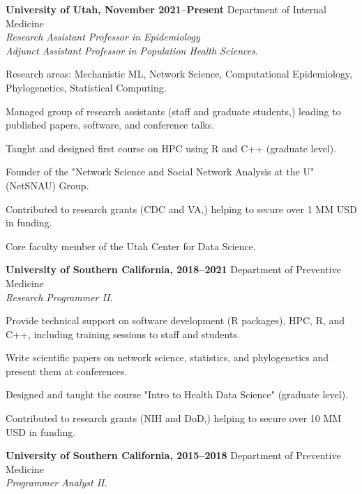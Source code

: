 \documentclass[letterpaper, 9pt]{article}
\newcommand{\myorange}{myteal!70!black}
\renewcommand{\textbf}[1]{{\bfseries\color{\myorange}#1}}
\renewenvironment{itemize}{
  \begin{list}{}{
    \setlength{\leftmargin}{0.3cm}
  }
}{
  \end{list}
}
\begin{document}
\begin{itemize}
\item \textbf{University of Utah, November 2021--Present} Department of Internal Medicine\\
\emph{Research Assistant Professor in Epidemiology}\\
\emph{Adjunct Assistant Professor in Population Health Sciences}. 
\begin{itemize}
	\item[-] Research areas: Mechanistic ML, Network Science, Computational Epidemiology, Phylogenetics, Statistical Computing.
	\item[-] Managed group of research assistants (staff and graduate students,) leading to published papers, software, and conference talks.
	\item[-] Taught and designed first course on HPC using R and C++ (graduate level).
	\item[-] Founder of the "Network Science and Social Network Analysis at the U" (NetSNAU) Group.
	\item[-] Contributed to research grants (CDC and VA,) helping to secure over 1 MM USD in funding.
	\item[-] Core faculty member of the Utah Center for Data Science.
\end{itemize}
\item \textbf{University of Southern California, 2018--2021} Department of Preventive Medicine\\\emph{Research Programmer II}.
\begin{itemize}
	\item[-] Provide technical support on software development (R packages), HPC, R, and C++, including training sessions to staff and students.
	\item[-] Write scientific papers on network science, statistics, and phylogenetics and present them at conferences.
	\item[-] Designed and taught the course "Intro to Health Data Science" (graduate level).
	\item[-] Contributed to research grants (NIH and DoD,) helping to secure over 10 MM USD in funding.
\end{itemize}
\item \textbf{University of Southern California, 2015--2018} Department of Preventive Medicine\\\emph{Programmer Analyst II}. 
\begin{itemize}

\end{itemize}
\end{itemize}
\end{document}
